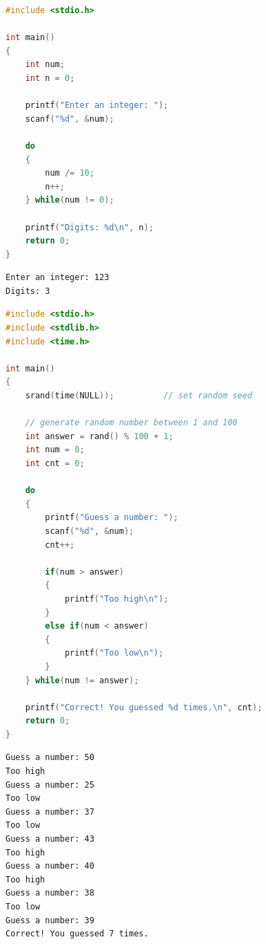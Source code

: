\vspace{0.5cm}


\begin{lstlisting}[language=C]
#include <stdio.h>

int main()
{
    int num;
    int n = 0;

    printf("Enter an integer: ");
    scanf("%d", &num);

    do
    {
        num /= 10;
        n++;
    } while(num != 0);

    printf("Digits: %d\n", n);
    return 0;
}
\end{lstlisting}

\begin{tcolorbox}
    \begin{verbatim}
Enter an integer: 123
Digits: 3
\end{verbatim}
\end{tcolorbox}

\vspace{0.5cm}


\begin{lstlisting}[language=C]
#include <stdio.h>
#include <stdlib.h>
#include <time.h>

int main()
{
    srand(time(NULL));          // set random seed

    // generate random number between 1 and 100
    int answer = rand() % 100 + 1;
    int num = 0;
    int cnt = 0;

    do
    {
        printf("Guess a number: ");
        scanf("%d", &num);
        cnt++;
        
        if(num > answer)
        {
            printf("Too high\n");
        }
        else if(num < answer)
        {
            printf("Too low\n");
        }
    } while(num != answer);
    
    printf("Correct! You guessed %d times.\n", cnt);
    return 0;
}
\end{lstlisting}

\begin{tcolorbox}
    \begin{verbatim}
Guess a number: 50
Too high
Guess a number: 25
Too low
Guess a number: 37
Too low
Guess a number: 43
Too high
Guess a number: 40
Too high
Guess a number: 38
Too low
Guess a number: 39
Correct! You guessed 7 times.
\end{verbatim}
\end{tcolorbox}

